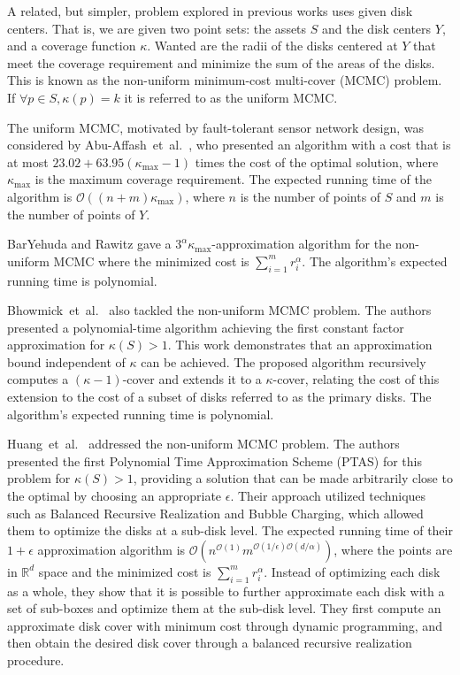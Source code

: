 \documentclass[letterpaper, 10 pt, conference]{ieeeconf}
\newcommand{\bigO}{\mathcal{O}} %
\newcommand{\points}{S}
\begin{document}
A related, but simpler, problem explored in previous works uses given disk centers.
That is, we are given two point sets: the assets $\points$ and the disk centers
$Y$, and a coverage function $\kappa$. Wanted are the radii of the disks
centered at $Y$ that meet the coverage requirement and minimize the sum of the
areas of the disks.  This is known as the non-uniform minimum-cost multi-cover
(MCMC) problem.
If $ \forall p \in \points, \kappa(p)=k $ it is referred to as the uniform MCMC.

The uniform MCMC, motivated by fault-tolerant sensor network design, was considered by Abu-Affash~et~al.~\cite{abu2011multi}, who presented an algorithm with a cost that is at most $23.02 + 63.95(\kappa_{\text{max}} - 1)$ times the cost of the optimal solution, where
$\kappa_{\text{max}}$ is the maximum coverage requirement.
The expected running time of the algorithm is $\bigO((n + m)\kappa_{\text{max}})$, where $n$ is the number of points of $\points$ and $m$  is the number of points of $Y$.

BarYehuda and Rawitz \cite{bar2013note} gave a $3^\alpha \kappa_{\text{max}}$-approximation algorithm for the non-uniform MCMC where the minimized cost is $\sum_{i=1}^{m} r_i^{\alpha}$.
The algorithm's expected running time   is polynomial.

Bhowmick~et~al.~\cite{bhowmick2013constant} also tackled the non-uniform MCMC problem.
The authors presented a polynomial-time algorithm achieving the first constant factor approximation for $\kappa(\points)>1$.
This work demonstrates that an approximation bound independent of $\kappa$ can be achieved.
The proposed algorithm recursively computes a $(\kappa - 1)$-cover and extends it to a $\kappa$-cover, relating the cost of this extension to the cost of a subset of disks referred to as the primary disks.
The algorithm's expected running time is polynomial.

Huang~et~al.~\cite{huang2021ptas,huang2024ptas} addressed the non-uniform MCMC problem.
The authors presented the first Polynomial Time Approximation Scheme (PTAS) for this problem for $\kappa(\points)>1$, providing a solution that can be made arbitrarily close to the optimal by choosing an appropriate $\epsilon$.
Their approach utilized techniques such as Balanced Recursive Realization and Bubble Charging, which allowed them to optimize the disks at a sub-disk level.
The expected running time of their $1+\epsilon$ approximation algorithm is $\bigO\left(n^{\bigO(1)} m^{\bigO(1/\epsilon) \bigO(d/\alpha)}\right)$, where the points are in $\mathbb{R}^d$ space and the minimized cost is $\sum_{i=1}^{m} r_i^{\alpha}$.
Instead of optimizing each disk as a whole, they show that it is possible to further approximate each disk with a set of sub-boxes and optimize them at the sub-disk level.
They first compute an approximate disk cover with minimum cost through dynamic programming, and then obtain the desired disk cover through a balanced recursive realization procedure.
\end{document}
